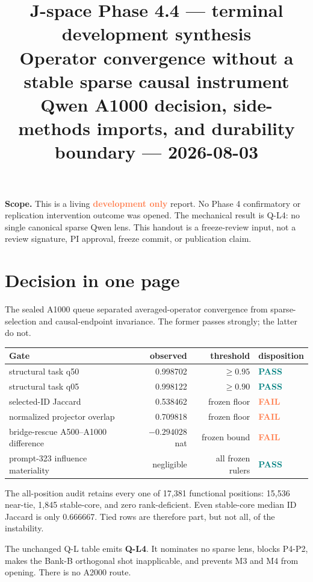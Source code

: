 \documentclass[10pt]{article}
\title{\vspace{-1.2em}J-space Phase 4.4 --- terminal development synthesis\\
\large Operator convergence without a stable sparse causal instrument\\[3pt]
\normalsize\textcolor{muted}{Qwen A1000 decision, side-methods imports, and durability boundary --- 2026-08-03}}
\author{}\date{}
\newcommand{\dev}{\textcolor{coral}{\textbf{development only}}}
\newcommand{\pass}{\textcolor{teal}{\textbf{PASS}}}
\newcommand{\fail}{\textcolor{coral}{\textbf{FAIL}}}
\begin{document}
\maketitle
\vspace{-2.7em}

\textbf{Scope.} This is a living \dev{} report. No Phase 4 confirmatory or
replication intervention outcome was opened. The mechanical result is Q-L4:
no single canonical sparse Qwen lens. This handout is a freeze-review input,
not a review signature, PI approval, freeze commit, or publication claim.

\section{Decision in one page}

The sealed A1000 queue separated averaged-operator convergence from
sparse-selection and causal-endpoint invariance. The former passes strongly;
the latter do not.

\begin{center}\small
\begin{tabular}{L{5.0cm}rrL{3.8cm}}
\toprule
Gate & observed & threshold & disposition\\
\midrule
structural task q50 & 0.998702 & $\geq 0.95$ & \pass\\
structural task q05 & 0.998122 & $\geq 0.90$ & \pass\\
selected-ID Jaccard & 0.538462 & frozen floor & \fail\\
normalized projector overlap & 0.709818 & frozen floor & \fail\\
bridge-rescue A500--A1000 difference & $-0.294028$ nat & frozen bound & \fail\\
prompt-323 influence materiality & negligible & all frozen rulers & \pass\\
\bottomrule
\end{tabular}
\end{center}

The all-position audit retains every one of 17,381 functional positions:
15,536 near-tie, 1,845 stable-core, and zero rank-deficient. Even stable-core
median ID Jaccard is only 0.666667. Tied rows are therefore part, but not all,
of the instability.

The unchanged Q-L table emits \textbf{Q-L4}. It nominates no sparse lens,
blocks P4-P2, makes the Bank-B orthogonal shot inapplicable, and prevents M3
and M4 from opening. There is no A2000 route.
\end{document}
